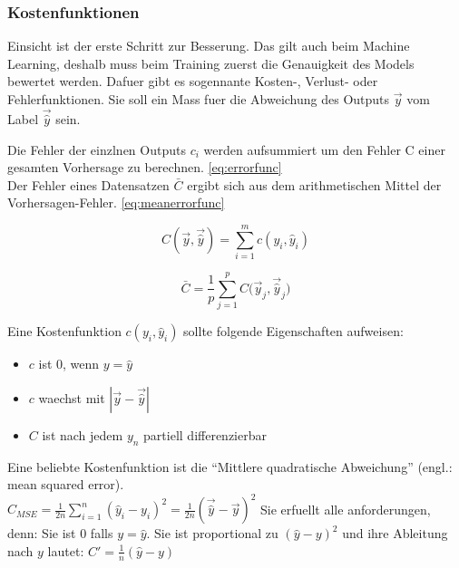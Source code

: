 \documentclass[../main]{subfiles}
\begin{document}
\subsubsection{Kostenfunktionen}
Einsicht ist der erste Schritt zur Besserung. Das gilt auch beim Machine Learning, deshalb muss beim Training zuerst die Genauigkeit des Models bewertet werden.
Dafuer gibt es sogennante Kosten-, Verlust- oder Fehlerfunktionen. Sie soll ein Mass fuer die Abweichung des Outputs $\vec{y}$ vom Label $\vec{\hat{y}}$ sein.
\par\medskip
Die Fehler der einzlnen Outputs $c_i$ werden aufsummiert um den Fehler C einer gesamten Vorhersage zu berechnen. \ref{eq:errorfunc}\\
Der Fehler eines Datensatzen $\bar{C}$ ergibt sich aus dem arithmetischen Mittel der Vorhersagen-Fehler. \ref{eq:meanerrorfunc}\\
%
\begin{minipage}[t]{0.5\textwidth}
    \centering
    \begin{equation}\label{eq:errorfunc}
        C(\vec{y},\vec{\hat{y}})=\displaystyle\sum_{i=1}^{m} c(y_i, \hat{y}_i)
    \end{equation}
\end{minipage}
\begin{minipage}[t]{0.5\textwidth}
    \centering
    \begin{equation}\label{eq:meanerrorfunc}
        \bar{C} = \frac{1}{p}\displaystyle\sum_{j=1}^{p} C\Big(\vec{y}_j,\vec{\hat{y}}_j\Big)
    \end{equation}
\end{minipage}

%
Eine Kostenfunktion $c(y_i,\hat{y}_i)$ sollte folgende Eigenschaften aufweisen:
\begin{itemize}
    \item{$c$ ist $0$, wenn $y = \hat{y}$}
    \item{$c$ waechst mit $|\vec{y}-\vec{\hat{y}}|$}
    \item{$C$ ist nach jedem $y_n$ partiell differenzierbar}
\end{itemize}

Eine beliebte Kostenfunktion ist die ``Mittlere quadratische Abweichung'' (engl.: mean squared error).\\
$\displaystyle C_{MSE} = \frac{1}{2n}\sum_{i=1}^{n}(\hat{y}_i - y_i)^2 = \frac{1}{2n}(\vec{\hat{y}} - \vec{y})^2$
Sie erfuellt alle anforderungen, denn:
Sie ist $0$ falls $y=\hat{y}$. Sie ist proportional zu $(\hat{y}-y)^2$ und ihre Ableitung nach $y$ lautet: $C'=\frac{1}{n}(\hat{y}-y)$
\end{document}
